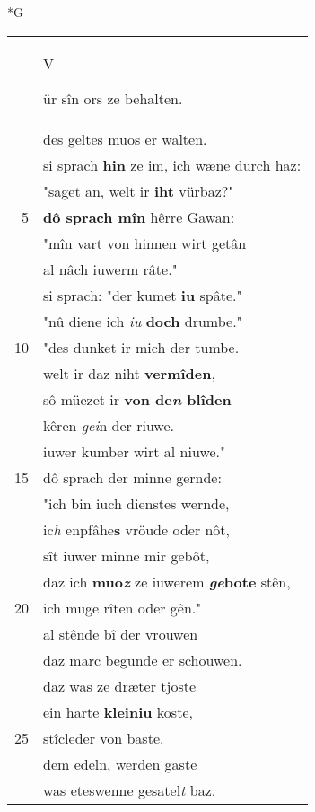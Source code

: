 \documentclass[8pt,a4paper,notitlepage]{article}
\begin{document}
\newpage
\begin{table}[ht]
\begin{minipage}[t]{0.5\linewidth}
\small
\begin{center}*G
\end{center}
\begin{tabular}{rl}
 & \begin{large}V\end{large}ür sîn ors ze behalten.\\ 
 & des geltes muos er walten.\\ 
 & si sprach \textbf{hin} ze im, ich wæne durch haz:\\ 
 & "saget an, welt ir \textbf{iht} vürbaz?"\\ 
5 & \textbf{dô sprach mîn} hêrre Gawan:\\ 
 & "mîn vart von hinnen wirt getân\\ 
 & al nâch iuwerm râte."\\ 
 & si sprach: "der kumet \textbf{iu} spâte."\\ 
 & "nû diene ich \textit{iu} \textbf{doch} drumbe."\\ 
10 & "des dunket ir mich der tumbe.\\ 
 & welt ir daz niht \textbf{vermîden},\\ 
 & sô müezet ir \textbf{von de\textit{n} blîden}\\ 
 & kêren \textit{gei}n der riuwe.\\ 
 & iuwer kumber wirt al niuwe."\\ 
15 & dô sprach der minne gernde:\\ 
 & "ich bin iuch dienstes wernde,\\ 
 & ic\textit{h} enpfâhe\textbf{s} vröude oder nôt,\\ 
 & sît iuwer minne mir gebôt,\\ 
 & daz ich \textbf{muo\textit{z}} ze iuwerem \textbf{\textit{ge}bote} stên,\\ 
20 & ich muge rîten oder gên."\\ 
 & al stênde bî der vrouwen\\ 
 & daz marc begunde er schouwen.\\ 
 & daz was ze dræter tjoste\\ 
 & ein harte \textbf{kleiniu} koste,\\ 
25 & stîcleder von baste.\\ 
 & dem edeln, werden gaste\\ 
 & was eteswenne gesatel\textit{t} baz.\\ 

\end{tabular}
\end{minipage}
\end{table}
\end{document}
